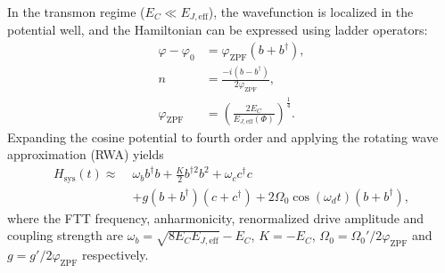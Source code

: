In the transmon regime (\(E_C \ll E_{J,\text{eff}}\)), the wavefunction is localized in the potential well, and the Hamiltonian can be expressed using ladder operators:
\begin{equation}
\begin{aligned}
    \varphi - \varphi_0 &= \varphi_{\text{ZPF}} \left( b + b^\dagger \right), \\
    n &= \frac{-i \left( b - b^\dagger \right)}{2 \varphi_{\text{ZPF}}}, \\
    \varphi_{\text{ZPF}} &= \left( \frac{2 E_C}{E_{J,\text{eff}} (\Phi)} \right)^{\frac{1}{4}}.
\end{aligned}
\end{equation}
Expanding the cosine potential to fourth order and applying the rotating wave approximation (RWA) yields
\begin{equation}
\begin{split}
    H_\text{sys}(t) \approx \; & \omega_{b} b^{\dagger} b + \frac{K}{2} b^{\dagger 2} b^{2}+\omega_c c^\dagger c \\
    & + g ( b+ b^{\dagger})( c+ c^{\dagger}) + 2\Omega_0\cos(\omega_{d}t)( b+ b^{\dagger}),
\end{split}
\end{equation}
where the FTT frequency, anharmonicity, renormalized drive amplitude and coupling strength are \(\omega_{b} = \sqrt{8E_{C}E_{J,\text{eff}} } - E_{C}\), \(K = -E_{C}\), \(\Omega_0 = \Omega_0'/2\varphi_{\text{ZPF}}\) and \(g = g'/2\varphi_{\text{ZPF}}\) respectively.

